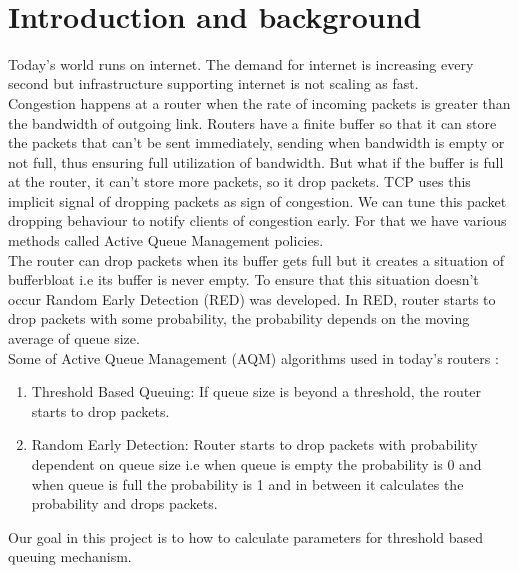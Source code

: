 \begin{center}
{\huge\textbf{\ttitle}}\\
\end{center}
\section{Introduction and background}
Today's world runs on internet. The demand for internet is increasing every second but infrastructure supporting internet is not scaling as fast. \\
Congestion happens at a router when the rate of incoming packets is greater than the bandwidth of outgoing link. Routers have a finite buffer so that it can store the packets that can't be sent immediately, sending when bandwidth is empty or not full, thus ensuring full utilization of bandwidth. But what if the buffer is full at the router, it can't store more packets, so it drop packets. TCP uses this implicit signal of dropping packets as sign of congestion. We can tune this packet dropping behaviour to notify clients of congestion early. For that we have various methods called Active Queue Management policies.\\ 
The router can drop packets when its buffer gets full but it creates a situation of bufferbloat i.e its buffer is never empty. To ensure that this situation doesn't occur Random Early Detection (RED) was developed. In RED, router starts to drop packets with some probability, the probability depends on the moving average of queue size. \\
Some of Active Queue Management (AQM) algorithms used in today's routers :
\begin{enumerate}
    \item Threshold Based Queuing: If queue size is beyond a threshold, the router starts to drop packets. %
    \item Random Early Detection: Router starts to drop packets with probability dependent on queue size i.e when queue is empty the probability is 0 and when queue is full the probability is 1 and in between it calculates the probability and drops packets.  %
\end{enumerate}
Our goal in this project is to how to calculate parameters for threshold based queuing mechanism.

\clearpage

